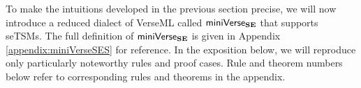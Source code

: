 
To make the intuitions developed in the previous section precise, we will now introduce a reduced dialect of VerseML called $\mathsf{miniVerse}_\textbf{SE}$ that supports seTSMs. 
The full definition of $\mathsf{miniVerse}_\textbf{SE}$ is given in Appendix \ref{appendix:miniVerseSES} for reference. In the exposition below, we will reproduce only particularly noteworthy rules and proof cases. Rule and theorem numbers below refer to corresponding rules and theorems in the appendix.

